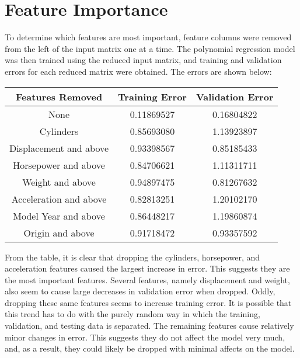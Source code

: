 \documentclass[12pt]{article}
\begin{document}
    \section{Feature Importance}
    
    To determine which features are most important, feature columns were removed from the left of the input matrix one at a time. The polynomial regression model was then trained using the reduced input matrix, and training and validation errors for each reduced matrix were obtained. The errors are shown below:
    \begin{center}
        \begin{tabular}{| c | c | c |}
    	    \hline
    	    Features Removed & Training Error & Validation Error \\ \hline
    	    None & 0.11869527 & 0.16804822 \\ \hline
    	    Cylinders & 0.85693080 & 1.13923897 \\ \hline
    	    Displacement and above & 0.93398567 & 0.85185433 \\ \hline
    	    Horsepower and above & 0.84706621 & 1.11311711 \\ \hline
    	    Weight and above & 0.94897475 & 0.81267632 \\ \hline
    	    Acceleration and above & 0.82813251 & 1.20102170 \\ \hline
    	    Model Year and above & 0.86448217 & 1.19860874 \\ \hline
    	    Origin and above & 0.91718472 & 0.93357592 \\
    	    \hline
        \end{tabular}
    \end{center}
    
	From the table, it is clear that dropping the cylinders, horsepower, and acceleration features caused the largest increase in error. This suggests they are the most important features. Several features, namely displacement and weight, also seem to cause large decreases in validation error when dropped. Oddly, dropping these same features seems to increase training error. It is possible that this trend has to do with the purely random way in which the training, validation, and testing data is separated. The remaining features cause relatively minor changes in error. This suggests they do not affect the model very much, and, as a result, they could likely be dropped with minimal affects on the model.
	
	\newpage
	
\end{document}

